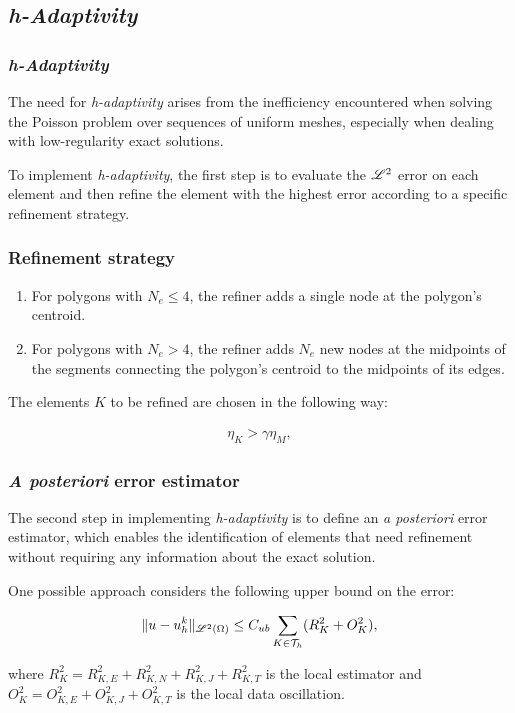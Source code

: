 \subsection{\textit{h-Adaptivity}}

\begin{frame}
    \frametitle{\textit{h-Adaptivity}}

    The need for \textit{h-adaptivity} arises from the inefficiency encountered when solving the Poisson problem over sequences of uniform meshes, especially when dealing with low-regularity exact solutions.

    To implement \textit{h-adaptivity}, the first step is to evaluate the $\mathscr{L}^2$ error on each element and then refine the element with the highest error according to a specific refinement strategy.    

\end{frame}

\begin{frame}
    \frametitle{Refinement strategy}

    \begin{enumerate}
        \item For polygons with $N_e \leq 4$, the refiner adds a single node at the polygon's centroid.
        \item For polygons with $N_e > 4$, the refiner adds $N_e$ new nodes at the midpoints of the segments connecting the polygon's centroid to the midpoints of its edges.
    \end{enumerate}

    The elements $K$ to be refined are chosen in the following way:

    \begin{gather}
        \eta_K > \gamma \eta_{M},
    \end{gather}

\end{frame}

\begin{frame}
    \frametitle{\textit{A posteriori} error estimator}

    The second step in implementing \textit{h-adaptivity} is to define an \textit{a posteriori} error estimator, which enables the identification of elements that need refinement without requiring any information about the exact solution.

    One possible approach considers the following upper bound on the error:

    \begin{gather}
        \lVert u - u^k_h \rVert_{\mathscr{L}^2(\Omega)} \leq C_{ub} \sum_{K \in \mathcal{T}_h} (R_K^2 + O_K^2),
    \end{gather}

    where $R_K^2 = R_{K, E}^2 + R_{K, N}^2 + R_{K, J}^2 + R_{K, T}^2$ is the local estimator and $O_K^2 = O_{K, E}^2 + O_{K, J}^2 + O_{K, T}^2$ is the local data oscillation.

\end{frame}

